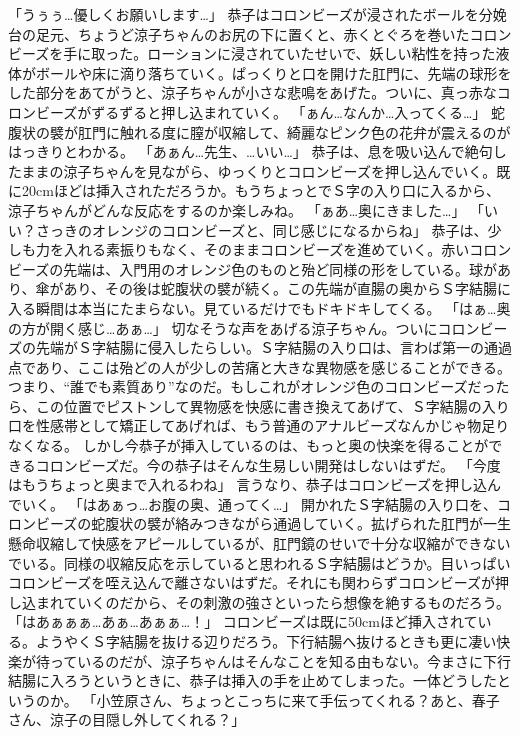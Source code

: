 「うぅぅ…優しくお願いします…」
恭子はコロンビーズが浸されたボールを分娩台の足元、ちょうど涼子ちゃんのお尻の下に置くと、赤くとぐろを巻いたコロンビーズを手に取った。ローションに浸されていたせいで、妖しい粘性を持った液体がボールや床に滴り落ちていく。ぱっくりと口を開けた肛門に、先端の球形をした部分をあてがうと、涼子ちゃんが小さな悲鳴をあげた。ついに、真っ赤なコロンビーズがずるずると押し込まれていく。
「ぁん…なんか…入ってくる…」
蛇腹状の襞が肛門に触れる度に膣が収縮して、綺麗なピンク色の花弁が震えるのがはっきりとわかる。
「あぁん…先生、…いい…」
恭子は、息を吸い込んで絶句したままの涼子ちゃんを見ながら、ゆっくりとコロンビーズを押し込んでいく。既に20cmほどは挿入されただろうか。もうちょっとでＳ字の入り口に入るから、涼子ちゃんがどんな反応をするのか楽しみね。
「ぁあ…奥にきました…」
「いい？さっきのオレンジのコロンビーズと、同じ感じになるからね」
恭子は、少しも力を入れる素振りもなく、そのままコロンビーズを進めていく。赤いコロンビーズの先端は、入門用のオレンジ色のものと殆ど同様の形をしている。球があり、傘があり、その後は蛇腹状の襞が続く。この先端が直腸の奥からＳ字結腸に入る瞬間は本当にたまらない。見ているだけでもドキドキしてくる。
「はぁ…奥の方が開く感じ…あぁ…」
切なそうな声をあげる涼子ちゃん。ついにコロンビーズの先端がＳ字結腸に侵入したらしい。Ｓ字結腸の入り口は、言わば第一の通過点であり、ここは殆どの人が少しの苦痛と大きな異物感を感じることができる。つまり、“誰でも素質あり”なのだ。もしこれがオレンジ色のコロンビーズだったら、この位置でピストンして異物感を快感に書き換えてあげて、Ｓ字結腸の入り口を性感帯として矯正してあげれば、もう普通のアナルビーズなんかじゃ物足りなくなる。
しかし今恭子が挿入しているのは、もっと奥の快楽を得ることができるコロンビーズだ。今の恭子はそんな生易しい開発はしないはずだ。
「今度はもうちょっと奥まで入れるわね」
言うなり、恭子はコロンビーズを押し込んでいく。
「はあぁっ…お腹の奥、通ってく…」
開かれたＳ字結腸の入り口を、コロンビーズの蛇腹状の襞が絡みつきながら通過していく。拡げられた肛門が一生懸命収縮して快感をアピールしているが、肛門鏡のせいで十分な収縮ができないでいる。同様の収縮反応を示していると思われるＳ字結腸はどうか。目いっぱいコロンビーズを咥え込んで離さないはずだ。それにも関わらずコロンビーズが押し込まれていくのだから、その刺激の強さといったら想像を絶するものだろう。
「はあぁぁぁ…あぁ…あぁぁ…！」
コロンビーズは既に50cmほど挿入されている。ようやくＳ字結腸を抜ける辺りだろう。下行結腸へ抜けるときも更に凄い快楽が待っているのだが、涼子ちゃんはそんなことを知る由もない。今まさに下行結腸に入ろうというときに、恭子は挿入の手を止めてしまった。一体どうしたというのか。
「小笠原さん、ちょっとこっちに来て手伝ってくれる？あと、春子さん、涼子の目隠し外してくれる？」
